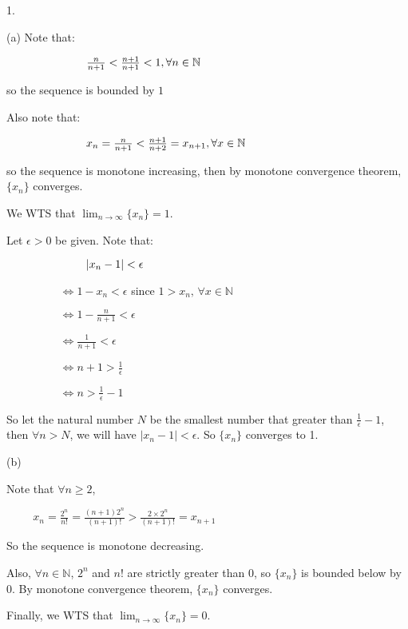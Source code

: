 \documentclass{article}
\begin{document}
1.

(a) Note that: 

$\hspace{2.5cm} \frac{n}{n+1} < \frac{n+1}{n+1} < 1 , \forall n \in \mathbb{N}$ 

so the sequence is bounded by $1$

Also note that: 

$\hspace{2.5cm} x_{n} = \frac{n}{n+1} < \frac{n+1}{n+2} = x_{n+1}, \forall x \in \mathbb{N}$ 

so the sequence is monotone increasing, then by monotone convergence theorem,  $\{ x_{n} \}$ converges. 

We WTS that $\lim_{n\rightarrow \infty}\{x_{n} \}= 1$. 

Let $\epsilon > 0$ be given. Note that: 

$\hspace{2.5cm} |x_{n} - 1| < \epsilon$

$\hspace{2cm} \Leftrightarrow 1-x_{n} < \epsilon $  since $ 1>x_{n} \text{, } \forall x \in \mathbb{N}$

$\hspace{2cm} \Leftrightarrow 1-\frac{n}{n+1} < \epsilon$

$\hspace{2cm} \Leftrightarrow \frac{1}{n+1} < \epsilon$

$\hspace{2cm} \Leftrightarrow n+1 > \frac{1}{\epsilon}$

$\hspace{2cm} \Leftrightarrow n > \frac{1}{\epsilon} -1$

So let the natural number $N$ be the smallest number that greater than $\frac{1}{\epsilon} -1$, then $\forall n > N$, we will have $|x_{n} - 1| < \epsilon$.
So $\{ x_{n} \} $ converges to 1.

(b)

Note that $\forall n \geq 2$, 

$\hspace{1cm} x_{n} = \frac{2^n}{n!} = \frac{(n+1)2^n}{(n+1)!} > \frac{2\times2^n}{(n+1)!} = x_{n+1}$

So the sequence is monotone decreasing. 

Also, $\forall n \in \mathbb{N}$, $2^n$ and $n!$ are strictly greater than 0, so $\{ x_{n} \}$ is bounded below by $0$. By monotone convergence theorem, $\{ x_{n} \}$ converges. 

Finally, we WTS that  $\lim_{n \rightarrow \infty} \{x_{n} \}= 0$.
\end{document}
